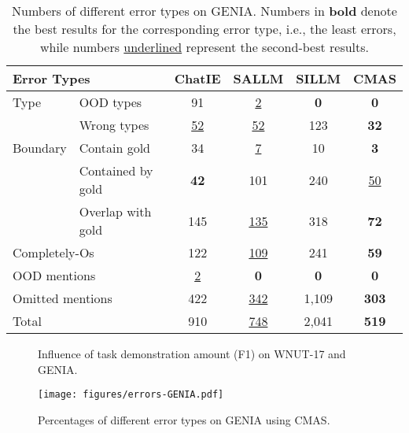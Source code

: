 \begin{table}[h]
	\centering
        \setlength\tabcolsep{1.8pt}
	\caption{Numbers of different error types on GENIA. Numbers in \textbf{bold} denote the best results for the corresponding error type, i.e., the least errors, while numbers \underline{underlined} represent the second-best results. }
	\begin{tabular}{l l c c c c}
		\toprule
		\multicolumn{2}{l}{\bf Error Types} & \bf ChatIE & \bf SALLM & \bf SILLM & \bf CMAS  \\ 
		\midrule
		Type & OOD types  & \phantom{0}91  & \phantom{00}\underline{2} & \phantom{00}\textbf{0} & \phantom{00}\textbf{0} \\ 
		~ &  Wrong types & \phantom{0}\underline{52}  & \phantom{0}\underline{52} & 123 & \phantom{0}\textbf{32} \\ 
		\midrule
		Boundary & Contain gold & \phantom{0}34 & \phantom{00}\underline{7} & \phantom{0}10 & \phantom{00}\textbf{3}  \\ 
		~ & Contained by gold & \phantom{0}\textbf{42} & 101 & 240 & \phantom{0}\underline{50} \\ 
		~ & Overlap with gold & 145 & \underline{135} & 318 & \phantom{0}\textbf{72}\\ 
		\midrule
		\multicolumn{2}{l}{Completely-Os}& 122 & \underline{109} & 241 & \phantom{0}\textbf{59} \\ \midrule
		\multicolumn{2}{l}{OOD mentions} & \phantom{00}\underline{2} & \phantom{00}\textbf{0} & \phantom{00}\textbf{0} & \phantom{00}\textbf{0}  \\ 
        \midrule		
  		\multicolumn{2}{l}{Omitted mentions} & 422  & \underline{342} & 1,109 & \textbf{303}\\ 
        \midrule
		\multicolumn{2}{l}{Total} & 910  & \underline{748} & 2,041 & \textbf{519} \\ 
        \bottomrule
	\end{tabular}
	\label{tab:error types-chapter5}
\end{table}

\begin{figure}[h!]
  \centering
    \caption{Influence of task demonstration amount (F1) on WNUT-17 and GENIA.}
  \label{fig:num-demo}
\end{figure}

\begin{figure}[h!] 
    \centering
    \texttt{[image: figures/errors-GENIA.pdf]}    
    \caption{Percentages of different error types on GENIA using \ac{CMAS}.}
    \label{fig:errors-chapter5}
\end{figure}

